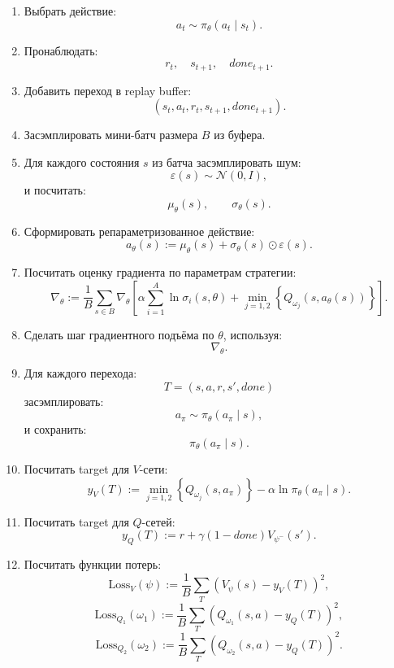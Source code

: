 \documentclass[12pt,a4paper]{article}
\begin{document}
\begin{enumerate}
    \item Выбрать действие:
    \[
    a_t\sim\pi_\theta(a_t\mid s_t).
    \]

    \item Пронаблюдать:
    \[
    r_t,\quad s_{t+1},\quad done_{t+1}.
    \]

    \item Добавить переход в replay buffer:
    \[
    (s_t,a_t,r_t,s_{t+1},done_{t+1}).
    \]

    \item Засэмплировать мини-батч размера $B$ из буфера.

    \item Для каждого состояния $s$ из батча засэмплировать шум:
    \[
    \varepsilon(s)\sim\mathcal N(0,I),
    \]
    и посчитать:
    \[
    \mu_\theta(s),
    \qquad
    \sigma_\theta(s).
    \]

    \item Сформировать репараметризованное действие:
    \[
    a_\theta(s)
    :=
    \mu_\theta(s)
    +
    \sigma_\theta(s)\odot\varepsilon(s).
    \]

    \item Посчитать оценку градиента по параметрам стратегии:
    \[
    \nabla_\theta
    :=
    \frac{1}{B}
    \sum_{s\in B}
    \nabla_\theta
    \left[
    \alpha
    \sum_{i=1}^{A}
    \ln\sigma_i(s,\theta)
    +
    \min_{j=1,2}
    \left\{
    Q_{\omega_j}
    \left(
    s,
    a_\theta(s)
    \right)
    \right\}
    \right].
    \]

    \item Сделать шаг градиентного подъёма по $\theta$, используя:
    \[
    \nabla_\theta.
    \]

    \item Для каждого перехода:
    \[
    T=(s,a,r,s',done)
    \]
    засэмплировать:
    \[
    a_\pi\sim\pi_\theta(a_\pi\mid s),
    \]
    и сохранить:
    \[
    \pi_\theta(a_\pi\mid s).
    \]

    \item Посчитать target для $V$-сети:
    \[
    y_V(T)
    :=
    \min_{j=1,2}
    \left\{
    Q_{\omega_j}(s,a_\pi)
    \right\}
    -
    \alpha
    \ln\pi_\theta(a_\pi\mid s).
    \]

    \item Посчитать target для $Q$-сетей:
    \[
    y_Q(T)
    :=
    r
    +
    \gamma(1-done)
    V_{\psi^-}(s').
    \]

    \item Посчитать функции потерь:
    \[
    \mathrm{Loss}_V(\psi)
    :=
    \frac{1}{B}
    \sum_T
    \left(
    V_\psi(s)-y_V(T)
    \right)^2,
    \]
    \[
    \mathrm{Loss}_{Q_1}(\omega_1)
    :=
    \frac{1}{B}
    \sum_T
    \left(
    Q_{\omega_1}(s,a)-y_Q(T)
    \right)^2,
    \]
    \[
    \mathrm{Loss}_{Q_2}(\omega_2)
    :=
    \frac{1}{B}
    \sum_T
    \left(
    Q_{\omega_2}(s,a)-y_Q(T)
    \right)^2.
    \]


\end{enumerate}
\end{document}
